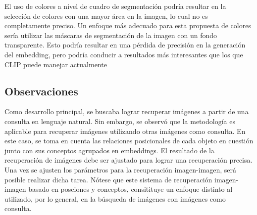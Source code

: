 El uso de colores a nivel de cuadro de segmentación podría resultar en la selección de colores con una mayor área en la imagen, lo cual no es completamente preciso. Un enfoque más adecuado para esta propuesta de colores sería utilizar las máscaras de segmentación de la imagen con un fondo transparente. Esto podría resultar en una pérdida de precisión en la generación del embedding, pero podría conducir a resultados más interesantes que los que CLIP puede manejar actualmente

 \subsection*{Observaciones}

Como desarrollo principal, se buscaba lograr recuperar imágenes a partir de una consulta en lenguaje natural. Sin embargo, se observó que la metodología es aplicable para recuperar imágenes utilizando otras imágenes como consulta. En este caso, se toma en cuenta las relaciones posicionales de cada objeto en cuestión junto con sus conceptos agrupados en embeddings. El resultado de la recuperación de imágenes debe ser ajustado para lograr una recuperación precisa. Una vez se ajusten los parámetros para la recuperación imagen-imagen, será posible realizar dicha tarea. N\'otese que este sistema de recuperaci\'on imagen-imagen basado en posciones y conceptos, consitituye un enfoque distinto al utilizado, por lo general, en la b\'usqueda de im\'agenes con im\'agenes como consulta.